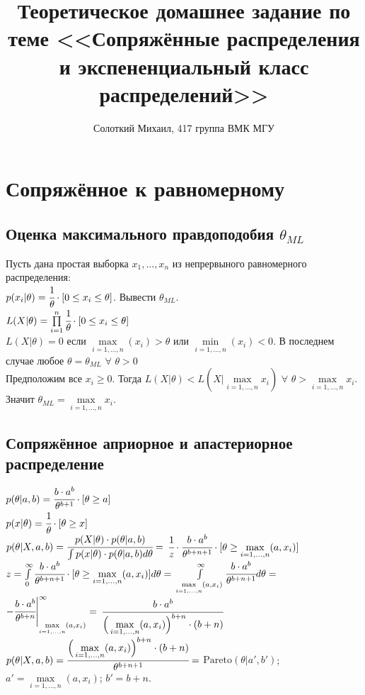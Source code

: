 \documentclass[10pt]{extarticle}
\title{Теоретическое домашнее задание по теме <<Сопряжённые распределения и экспененциальный класс распределений>>}
\author{Солоткий Михаил, 417 группа ВМК МГУ}
\begin{document}
\maketitle
	\section{Сопряжённое к равномерному}
	\subsection{Оценка максимального правдоподобия $\theta_{ML}$}
	Пусть дана простая выборка $x_1, \dots, x_n$  из непрервыного равномерного распределения: \\
	$p(x_i | \theta) = \cfrac{1}{\theta} \cdot [0 \leq x_i \leq \theta]$. Вывести $\theta_{ML}$. \\
	$L(X | \theta) = \prod\limits_{i = 1}^n \cfrac{1}{\theta} \cdot [0 \leq x_i \leq \theta]$ \\
	$L(X | \theta) = 0$ если $\max\limits_{i = 1, \dots, n}(x_i) > \theta$ или $\min\limits_{i = 1, \dots, n}(x_i) < 0$. В последнем случае любое $\theta = \theta_{ML}$ $\forall$ $\theta > 0$ \\
	Предположим все $x_i \geq 0$. Тогда $L(X | \theta) < L(X | \max\limits_{i = 1, \dots, n} x_i)$ $\forall$ $\theta > \max\limits_{i = 1, \dots, n} x_i$. Значит $\theta_{ML} = \max\limits_{i = 1, \dots, n} x_i$.
	\subsection{Сопряжённое априорное и апастериорное распределение}
	$p(\theta | a, b) = \cfrac{b \cdot a^b}{\theta^{b + 1}} \cdot [\theta \geq a]$ \\
	$p(x | \theta) = \cfrac{1}{\theta} \cdot [\theta \geq x]$ \\
	$p(\theta | X, a, b) = \cfrac{p(X | \theta) \cdot p(\theta | a, b)}{\int p(x | \theta) \cdot p(\theta | a, b) d \theta}=$
	$\cfrac{1}{z} \cdot \cfrac{b \cdot a^b}{\theta^{b +n + 1}} \cdot [\theta \geq \max\limits_{i = 1, \dots, n}(a, x_i)]$ \\
	$z = \int\limits_0^{\infty} \cfrac{b \cdot a^b}{\theta^{b +n + 1}} \cdot [\theta \geq \max\limits_{i = 1, \dots, n}(a, x_i)] d \theta =$
	$\int\limits_{\max\limits_{i = 1, \dots, n}(a, x_i)}^{\infty} \cfrac{b \cdot a^b}{\theta^{b +n + 1}} d \theta =$
	$- \cfrac{b \cdot a^b}{\theta^{b + n}} \Bigg|_{\max\limits_{i = 1, \dots, n}(a, x_i)}^{\infty}=$
	$\cfrac{b \cdot a^b}{\Big( \max\limits_{i = 1, \dots, n} (a, x_i) \Big)^{b + n} \cdot (b + n)}$ \\
	$p(\theta | X, a, b) = \cfrac{\Big( \max\limits_{i = 1, \dots, n} (a, x_i) \Big)^{b + n} \cdot (b + n)}{\theta^{b + n + 1}}=$
	$\mathrm{Pareto}(\theta | a', b')$;
	$a' = \max\limits_{i = 1, \dots, n} (a, x_i)$;
	$b' = b + n$.
\end{document}
